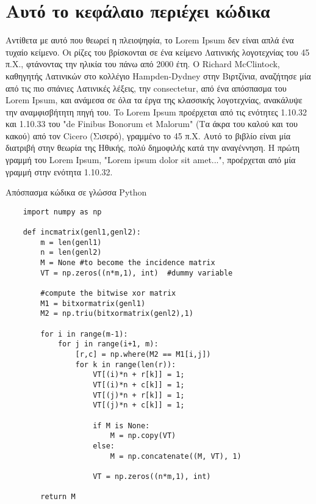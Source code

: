 \chapter{Αυτό το κεφάλαιο περιέχει κώδικα}
    Αντίθετα με αυτό που θεωρεί η πλειοψηφία, το Lorem Ipsum δεν είναι απλά ένα τυχαίο κείμενο. Οι ρίζες του
    βρίσκονται σε ένα κείμενο Λατινικής λογοτεχνίας του 45 π.Χ., φτάνοντας την ηλικία του πάνω από 2000 έτη.
    Ο Richard McClintock, καθηγητής Λατινικών στο κολλέγιο Hampden-Dydney στην Βιρτζίνια, αναζήτησε μία από
    τις πιο σπάνιες Λατινικές λέξεις, την consectetur, από ένα απόσπασμα του Lorem Ipsum, και ανάμεσα σε όλα
    τα έργα της κλασσικής λογοτεχνίας, ανακάλυψε την αναμφισβήτητη πηγή του. To Lorem Ipsum προέρχεται από
    τις ενότητες 1.10.32 και 1.10.33 του "de Finibus Bonorum et Malorum" (Τα άκρα του καλού και του κακού) από
    τον Cicero (Σισερό), γραμμένο το 45 π.Χ. Αυτό το βιβλίο είναι μία διατριβή στην θεωρία της Ηθικής, πολύ
    δημοφιλής κατά την αναγέννηση. Η πρώτη γραμμή του Lorem Ipsum, "Lorem ipsum dolor sit amet...", προέρχεται
    από μία γραμμή στην ενότητα 1.10.32.

    \begin{listing}[ht]
    \caption{Απόσπασμα κώδικα σε γλώσσα Python}
    \label{listing:python example}

    \begin{verbatim}
    import numpy as np
        
    def incmatrix(genl1,genl2):
        m = len(genl1)
        n = len(genl2)
        M = None #to become the incidence matrix
        VT = np.zeros((n*m,1), int)  #dummy variable
        
        #compute the bitwise xor matrix
        M1 = bitxormatrix(genl1)
        M2 = np.triu(bitxormatrix(genl2),1) 
        
        for i in range(m-1):
            for j in range(i+1, m):
                [r,c] = np.where(M2 == M1[i,j])
                for k in range(len(r)):
                    VT[(i)*n + r[k]] = 1;
                    VT[(i)*n + c[k]] = 1;
                    VT[(j)*n + r[k]] = 1;
                    VT[(j)*n + c[k]] = 1;
        
                    if M is None:
                        M = np.copy(VT)
                    else:
                        M = np.concatenate((M, VT), 1)
        
                    VT = np.zeros((n*m,1), int)
        
        return M
    \end{verbatim}
    \end{listing}

\newpage